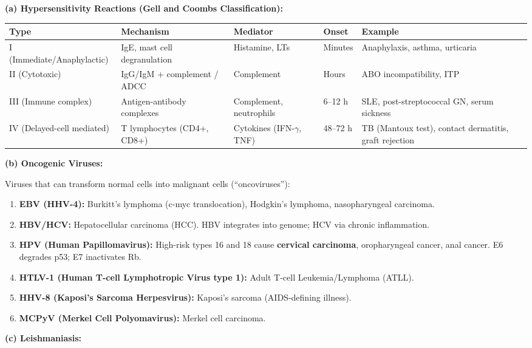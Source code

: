 \documentclass[11pt,a4paper]{article}
\begin{document}
\begin{ansbox}
\textbf{(a) Hypersensitivity Reactions (Gell and Coombs Classification):}

\begin{center}
\begin{tabular}{lllll}
\toprule
\textbf{Type} & \textbf{Mechanism} & \textbf{Mediator} & \textbf{Onset} & \textbf{Example} \\
\midrule
I (Immediate/Anaphylactic) & IgE, mast cell degranulation & Histamine, LTs & Minutes & Anaphylaxis, asthma, urticaria \\
II (Cytotoxic) & IgG/IgM + complement / ADCC & Complement & Hours & ABO incompatibility, ITP \\
III (Immune complex) & Antigen-antibody complexes & Complement, neutrophils & 6--12 h & SLE, post-streptococcal GN, serum sickness \\
IV (Delayed-cell mediated) & T lymphocytes (CD4+, CD8+) & Cytokines (IFN-$\gamma$, TNF) & 48--72 h & TB (Mantoux test), contact dermatitis, graft rejection \\
\bottomrule
\end{tabular}
\end{center}

\textbf{(b) Oncogenic Viruses:}

Viruses that can transform normal cells into malignant cells (``oncoviruses''):
\begin{enumerate}[leftmargin=*]
    \item \textbf{EBV (HHV-4):} Burkitt's lymphoma (c-myc translocation), Hodgkin's lymphoma, nasopharyngeal carcinoma.
    \item \textbf{HBV/HCV:} Hepatocellular carcinoma (HCC). HBV integrates into genome; HCV via chronic inflammation.
    \item \textbf{HPV (Human Papillomavirus):} High-risk types 16 and 18 cause \textbf{cervical carcinoma}, oropharyngeal cancer, anal cancer. E6 degrades p53; E7 inactivates Rb.
    \item \textbf{HTLV-1 (Human T-cell Lymphotropic Virus type 1):} Adult T-cell Leukemia/Lymphoma (ATLL).
    \item \textbf{HHV-8 (Kaposi's Sarcoma Herpesvirus):} Kaposi's sarcoma (AIDS-defining illness).
    \item \textbf{MCPyV (Merkel Cell Polyomavirus):} Merkel cell carcinoma.
\end{enumerate}

\textbf{(c) Leishmaniasis:}


\end{ansbox}
\end{document}
